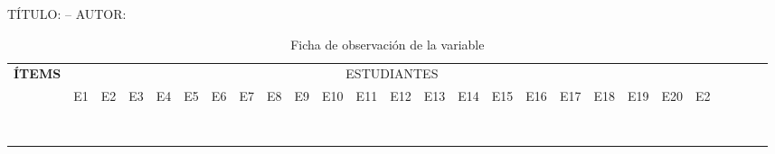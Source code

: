 \documentclass[12pt,a4paper]{article}
\newcommand{\ce}{\centering}
\newcommand\Tstrut{\rule{0pt}{2.35ex}}
\begin{document}
\begin{landscape}
	TÍTULO: \titulo -- AUTOR: \autor
	\begin{table}[ht!]\caption{Ficha de observación de la variable\MakeTextLowercase{\variablei}}
		\centering  \renewcommand\tabcolsep{0.1cm}\renewcommand{}
		\scriptsize
		\begin{tabular}{|l|l|l|l|l|l|l|l|l|l|l|l|l|l|l|l|l|l|l|l|l|l|l|l|l|l|}
			\hline
			\multirow{2}{*}{ \ce\bf ÍTEMS}                                                                         & \multicolumn{21}{c|}{ESTUDIANTES}\Tstrut                                                                                                                       \\\cline{2-22}
			                                                                                                       & E1                                       & E2 & E3 & E4 & E5 & E6 & E7 & E8 & E9 & E10 & E11 & E12 & E13 & E14 & E15 & E16 & E17 & E18 & E19 & E20 & E2\Tstrut \\\hline
		 &                                          &    &    &    &    &    &    &    &    &     &     &     &     &     &     &     &     &     &     &     &           \\\hline
		 &                                          &    &    &    &    &    &    &    &    &     &     &     &     &     &     &     &     &     &     &     &           \\\hline
		 &                                          &    &    &    &    &    &    &    &    &     &     &     &     &     &     &     &     &     &     &     &           \\\hline
		 &                                          &    &    &    &    &    &    &    &    &     &     &     &     &     &     &     &     &     &     &     &           \\\hline
		 &                                          &    &    &    &    &    &    &    &    &     &     &     &     &     &     &     &     &     &     &     &           \\\hline
		 &                                          &    &    &    &    &    &    &    &    &     &     &     &     &     &     &     &     &     &     &     &           \\\hline
		 &                                          &    &    &    &    &    &    &    &    &     &     &     &     &     &     &     &     &     &     &     &           \\\hline
		 &                                          &    &    &    &    &    &    &    &    &     &     &     &     &     &     &     &     &     &     &     &           \\\hline

\end{tabular}
\end{table}
\end{landscape}
\end{document}
